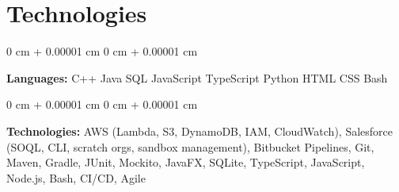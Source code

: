 \documentclass[10pt, letterpaper]{article}
\newenvironment{onecolentry}{
    \begin{adjustwidth}{
        0 cm + 0.00001 cm
    }{
        0 cm + 0.00001 cm
    }
}{
    \end{adjustwidth}
} %
\begin{document}
\section{Technologies}
\begin{onecolentry}
	\textbf{Languages:} C++ \textbar{} Java \textbar{} SQL \textbar{} JavaScript \textbar{} TypeScript \textbar{} Python \textbar{} HTML \textbar{} CSS \textbar{} Bash
\end{onecolentry}

\vspace{0.2 cm}

\begin{onecolentry}
	\textbf{Technologies:} AWS (Lambda, S3, DynamoDB, IAM, CloudWatch), Salesforce (SOQL, CLI, scratch orgs, sandbox management), Bitbucket Pipelines, Git, Maven, Gradle, JUnit, Mockito, JavaFX, SQLite, TypeScript, JavaScript, Node.js, Bash, CI/CD, Agile
\end{onecolentry}
\end{document}
